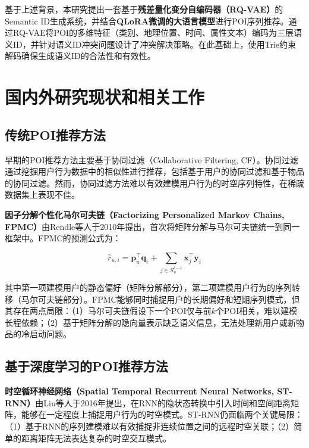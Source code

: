 基于上述背景，本研究提出一套基于\textbf{残差量化变分自编码器（RQ-VAE）}的Semantic ID生成系统，并结合\textbf{QLoRA微调的大语言模型}进行POI序列推荐。通过RQ-VAE将POI的多维特征（类别、地理位置、时间、属性文本）编码为三层语义ID，并针对语义ID冲突问题设计了冲突解决策略。在此基础上，使用Trie约束解码确保生成语义ID的合法性和有效性。

\section{国内外研究现状和相关工作}
\label{sec:related}

\subsection{传统POI推荐方法}
\label{sec:traditional_poi}

早期的POI推荐方法主要基于协同过滤（Collaborative Filtering, CF）。协同过滤通过挖掘用户行为数据中的相似性进行推荐，包括基于用户的协同过滤和基于物品的协同过滤。然而，协同过滤方法难以有效建模用户行为的时空序列特性，在稀疏数据集上表现不佳。

\textbf{因子分解个性化马尔可夫链（Factorizing Personalized Markov Chains, FPMC）}\cite{rendle2010fpmc}由Rendle等人于2010年提出，首次将矩阵分解与马尔可夫链统一到同一框架中。FPMC的预测公式为：

\begin{equation}
\hat{r}_{u,i} = \mathbf{p}_u^\top \mathbf{q}_i + \sum_{j \in S_{u}^{t-1}} \mathbf{x}_j^\top \mathbf{y}_i
\label{eq:fpmc}
\end{equation}

其中第一项建模用户的静态偏好（矩阵分解部分），第二项建模用户行为的序列转移（马尔可夫链部分）。FPMC能够同时捕捉用户的长期偏好和短期序列模式，但其存在两点局限：（1）马尔可夫链假设下一个POI仅与前$k$个POI相关，难以建模长程依赖；（2）基于矩阵分解的隐向量表示缺乏语义信息，无法处理新用户或新物品的冷启动问题。

\subsection{基于深度学习的POI推荐方法}
\label{sec:deep_poi}

\textbf{时空循环神经网络（Spatial Temporal Recurrent Neural Networks, ST-RNN）}\cite{liu2016predicting}由Liu等人于2016年提出，在RNN的隐状态转换中引入时间和空间距离矩阵，能够在一定程度上捕捉用户行为的时空模式。ST-RNN仍面临两个关键局限：（1）基于RNN的序列建模难以有效捕捉非连续位置之间的远程时空关联；（2）简单的距离矩阵无法表达复杂的时空交互模式。

